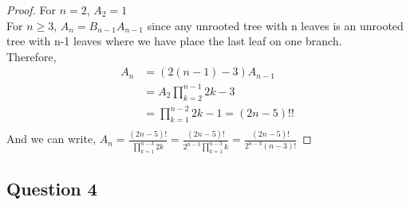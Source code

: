 \documentclass[]{article}
\theoremstyle{definition}
\begin{document}
\begin{proof}For $n=2$, $A_{2} = 1$\\
For $n\geq 3$, $A_{n} = B_{n-1}A_{n-1}$ since any unrooted tree with n leaves is an unrooted tree with n-1 leaves where we have place the last leaf on one branch.\\
Therefore, 
\begin{align*}
A_{n} &= (2(n-1)-3)A_{n-1}\\
&= A_{2}{\displaystyle{\prod_{k=2}^{n-1} 2k - 3}}\\
&= {\displaystyle \prod_{k=1}^{n-2} 2k - 1} = (2n-5)!!\\
\end{align*}
And we can write,
$
A_{n} = \frac{(2n - 5)!}{\displaystyle \prod_{k=1}^{n-3} 2k}
=  \frac{(2n - 5)!}{2^{n-3}\displaystyle \prod_{k=1}^{n-3}k}
= \frac{(2n - 5)!}{2^{n-3}(n-3)!}
$
\end{proof}
\newpage
\subsection{Question 4}
\end{document}
